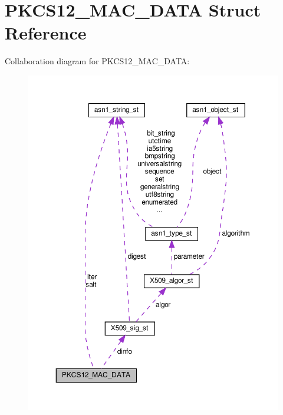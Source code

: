 \hypertarget{structPKCS12__MAC__DATA}{}\section{P\+K\+C\+S12\+\_\+\+M\+A\+C\+\_\+\+D\+A\+TA Struct Reference}
\label{structPKCS12__MAC__DATA}


Collaboration diagram for P\+K\+C\+S12\+\_\+\+M\+A\+C\+\_\+\+D\+A\+TA\+:
\nopagebreak
\begin{figure}[H]
\begin{center}
\leavevmode
\includegraphics[width=350pt]{structPKCS12__MAC__DATA__coll__graph}
\end{center}
\end{figure}
